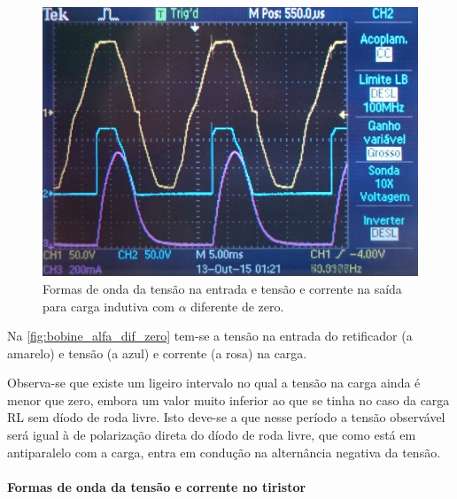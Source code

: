 \documentclass[a4paper,11pt]{article}
\numberwithin{equation}{section}
\begin{document}
\begin{figure}[h]
	\centering
	\includegraphics[keepaspectratio=true, scale=0.11]{img/figs/bobine_alfa_dif_zero}
	\caption{Formas de onda da tensão na entrada e tensão e corrente na saída para carga indutiva com $\alpha$ diferente de zero.}
	\label{fig:bobine_alfa_dif_zero}
	\vspace{-0.8em}
\end{figure}

Na \autoref{fig:bobine_alfa_dif_zero} tem-se a tensão na entrada do retificador (a amarelo) e tensão (a azul) e corrente (a rosa) na carga.

Observa-se que existe um ligeiro intervalo no qual a tensão na carga ainda é menor que zero, embora um valor muito inferior ao que se tinha no caso da carga RL sem díodo de roda livre. Isto deve-se a que nesse período a tensão observável será igual à de polarização direta do díodo de roda livre, que como está em antiparalelo com a carga, entra em condução na alternância negativa da tensão. 

\pagebreak

\paragraph{Formas de onda da tensão e corrente no tiristor}\mbox{}\
\end{document}
